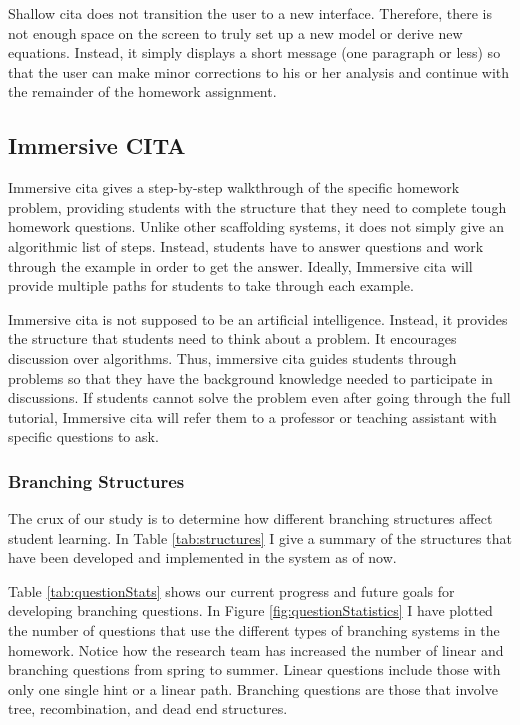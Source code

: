 Shallow \gls{cita} does not transition the user to a new interface. Therefore, there is not enough space on the screen to truly set up a new model or derive new equations. Instead, it simply displays a short message (one paragraph or less) so that the user can make minor corrections to his or her analysis and continue with the remainder of the homework assignment.

\subsection{Immersive CITA}

Immersive \gls{cita} gives a step-by-step walkthrough of the specific homework problem, providing students with the structure that they need to complete tough homework questions. Unlike other scaffolding systems, it does not simply give an algorithmic list of steps. Instead, students have to answer questions and work through the example in order to get the answer. Ideally, Immersive \gls{cita} will provide multiple paths for students to take through each example.

Immersive \gls{cita} is not supposed to be an artificial intelligence. Instead, it provides the structure that students need to think about a problem. It encourages discussion over algorithms. Thus, immersive \gls{cita} guides students through problems so that they have the background knowledge needed to participate in discussions. If students cannot solve the problem even after going through the full tutorial, Immersive \gls{cita} will refer them to a professor or teaching assistant with specific questions to ask.

\subsubsection{Branching Structures}

The crux of our study is to determine how different branching structures affect student learning. In Table \ref{tab:structures} I give a summary of the structures that have been developed and implemented in the system as of now.

Table \ref{tab:questionStats} shows our current progress and future goals for developing branching questions. In Figure \ref{fig:questionStatistics} I have plotted the number of questions that use the different types of branching systems in the homework. Notice how the research team has increased the number of linear and branching questions from spring to summer. Linear questions include those with only one single hint or a linear path. Branching questions are those that involve tree, recombination, and dead end structures.

